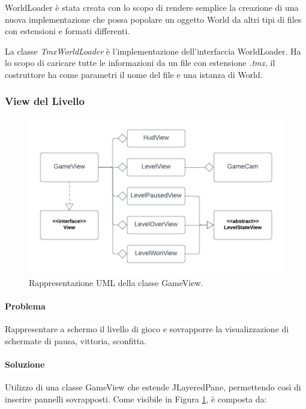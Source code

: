 \documentclass[a4paper,12pt]{report}
\begin{document}
WorldLoader è stata creata con lo scopo di rendere semplice la creazione di una nuova implementazione che possa popolare un oggetto World da altri tipi di files con estensioni e formati differenti.

La classe \emph{TmxWorldLoader} è l'implementazione dell'interfaccia WorldLoader. Ha lo scopo di caricare tutte le informazioni da un file con estensione \emph{.tmx}, il costruttore ha come parametri il nome del file e una istanza di World.

\subsubsection{View del Livello}

\begin{figure}[H]
\centering{}
\includegraphics[scale=0.8] {img/view.png}
\caption{Rappresentazione UML della classe GameView.}
\label{img:view}
\end{figure}

\paragraph{Problema} Rappresentare a schermo il livello di gioco e sovrapporre la visualizzazione di schermate di pausa, vittoria, sconfitta.

\paragraph{Soluzione} Utilizzo di una classe GameView che estende JLayeredPane, permettendo così di inserire pannelli sovrapposti. Come visibile in Figura \ref{img:view}, è composta da:
\end{document}

